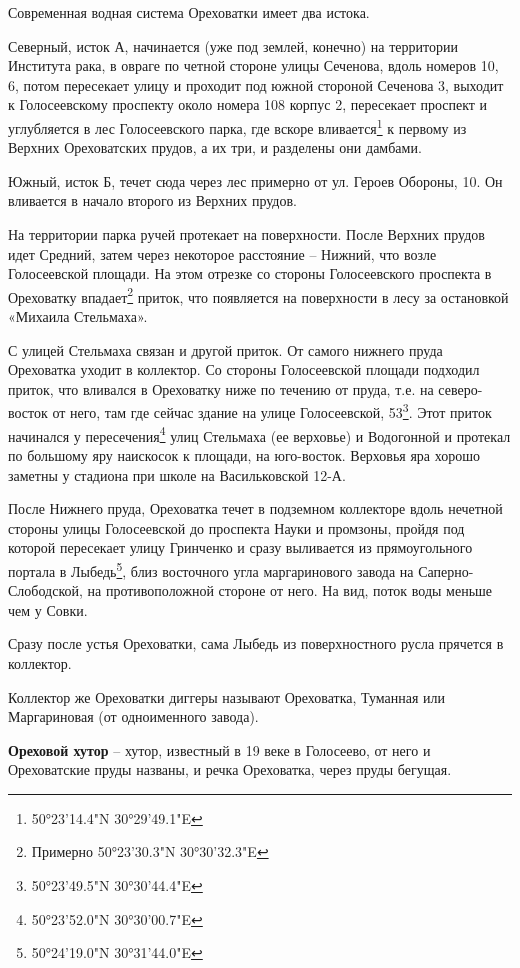 Современная водная система Ореховатки имеет два истока.

Северный, исток А, начинается (уже под землей, конечно) на территории Института рака, в овраге по четной стороне улицы Сеченова, вдоль номеров 10, 6, потом пересекает улицу и проходит под южной стороной Сеченова 3, выходит к Голосеевскому проспекту около номера 108 корпус 2, пересекает проспект и углубляется в лес Голосеевского парка, где вскоре вливается\footnote{50°23'14.4"N 30°29'49.1"E} к первому из Верхних Ореховатских прудов, а их три, и разделены они дамбами.

Южный, исток Б, течет сюда через лес примерно от ул. Героев Обороны, 10. Он вливается в начало второго из Верхних прудов.

На территории парка ручей протекает на поверхности. После Верхних прудов идет Средний, затем через некоторое расстояние – Нижний, что возле Голосеевской площади. На этом отрезке со стороны Голосеевского проспекта в Ореховатку впадает\footnote{Примерно 50°23'30.3"N 30°30'32.3"E} приток, что появляется на поверхности в лесу за остановкой «Михаила Стельмаха». 

С улицей Стельмаха связан и другой приток. 
От самого нижнего пруда Ореховатка уходит в коллектор. Со стороны Голосеевской площади подходил приток, что вливался в Ореховатку ниже по течению от пруда, т.е. на северо-восток от него, там где сейчас здание на улице Голосеевской, 53\footnote{50°23'49.5"N 30°30'44.4"E}. Этот приток начинался у пересечения\footnote{50°23'52.0"N 30°30'00.7"E} улиц Стельмаха (ее верховье) и Водогонной и протекал по большому яру наискосок к площади, на юго-восток. Верховья яра хорошо заметны у стадиона при школе на Васильковской 12-А.

После Нижнего пруда, Ореховатка течет в подземном коллекторе вдоль нечетной стороны улицы Голосеевской до проспекта Науки и промзоны, пройдя под которой пересекает улицу Гринченко и сразу выливается из прямоугольного портала в Лыбедь\footnote{50°24'19.0"N 30°31'44.0"E}, близ восточного угла маргаринового завода на Саперно-Слободской, на противоположной стороне от него. На вид, поток воды меньше чем у Совки.

Сразу после устья Ореховатки, сама Лыбедь из поверхностного русла прячется в коллектор.

Коллектор же Ореховатки диггеры называют Ореховатка, Туманная или Маргариновая (от одноименного завода).\\

\medskip


\textbf{Ореховой хутор} – хутор, известный в 19 веке в Голосеево, от него и Ореховатские пруды названы, и речка Ореховатка, через пруды бегущая.\\

